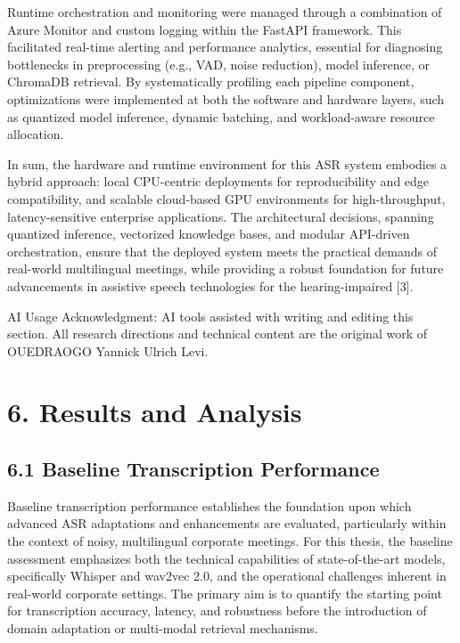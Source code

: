 \documentclass[12pt,a4paper]{article}
\begin{document}
Runtime orchestration and monitoring were managed through a combination of Azure Monitor and custom logging within the FastAPI framework. This facilitated real-time alerting and performance analytics, essential for diagnosing bottlenecks in preprocessing (e.g., VAD, noise reduction), model inference, or ChromaDB retrieval. By systematically profiling each pipeline component, optimizations were implemented at both the software and hardware layers, such as quantized model inference, dynamic batching, and workload-aware resource allocation.


In sum, the hardware and runtime environment for this ASR system embodies a hybrid approach: local CPU-centric deployments for reproducibility and edge compatibility, and scalable cloud-based GPU environments for high-throughput, latency-sensitive enterprise applications. The architectural decisions, spanning quantized inference, vectorized knowledge bases, and modular API-driven orchestration, ensure that the deployed system meets the practical demands of real-world multilingual meetings, while providing a robust foundation for future advancements in assistive speech technologies for the hearing-impaired [3].


AI Usage Acknowledgment: AI tools assisted with writing and editing this section. All research directions and technical content are the original work of OUEDRAOGO Yannick Ulrich Levi.


\section{6. Results and Analysis}


\subsection{6.1 Baseline Transcription Performance}


Baseline transcription performance establishes the foundation upon which advanced ASR adaptations and enhancements are evaluated, particularly within the context of noisy, multilingual corporate meetings. For this thesis, the baseline assessment emphasizes both the technical capabilities of state-of-the-art models, specifically Whisper and wav2vec 2.0, and the operational challenges inherent in real-world corporate settings. The primary aim is to quantify the starting point for transcription accuracy, latency, and robustness before the introduction of domain adaptation or multi-modal retrieval mechanisms.
\end{document}
